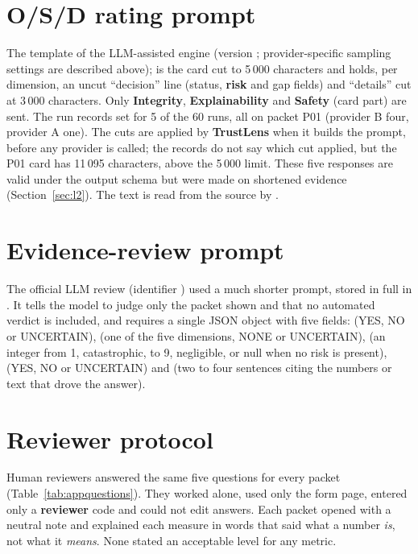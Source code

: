 \section{O/S/D rating prompt}\label{app:ratingprompt}
The template of the LLM-assisted engine (version ; provider-specific sampling settings are described above);  is the card cut to 5\,000 characters and  holds, per dimension, an uncut ``decision'' line (status, \textbf{risk} and gap fields) and ``details'' cut at 3\,000 characters. Only \textbf{Integrity}, \textbf{Explainability} and \textbf{Safety} (card part) are sent. The run records set  for 5 of the 60 runs, all on packet P01 (provider B four, provider A one). The cuts are applied by \textbf{TrustLens} when it builds the prompt, before any provider is called; the records do not say which cut applied, but the P01 card has 11\,095 characters, above the 5\,000 limit. These five responses are valid under the output schema but were made on shortened evidence (Section~\ref{sec:l2}). The text is read from the source by .



\section{Evidence-review prompt}\label{app:reviewprompt}
The official LLM review (identifier ) used a much shorter prompt, stored in full in . It tells the model to judge only the packet shown and that no automated verdict is included, and requires a single JSON object with five fields:  (YES, NO or UNCERTAIN),  (one of the five dimensions, NONE or UNCERTAIN),  (an integer from 1, catastrophic, to 9, negligible, or null when no risk is present),  (YES, NO or UNCERTAIN) and  (two to four sentences citing the numbers or text that drove the answer). 

\section{Reviewer protocol}\label{app:reviewer}
Human reviewers answered the same five questions for every packet (Table~\ref{tab:appquestions}). They worked alone, used only the form page, entered only a \textbf{reviewer} code and could not edit answers. Each packet opened with a neutral note and explained each measure in words that said what a number \emph{is}, not what it \emph{means}. None stated an acceptable level for any metric.

